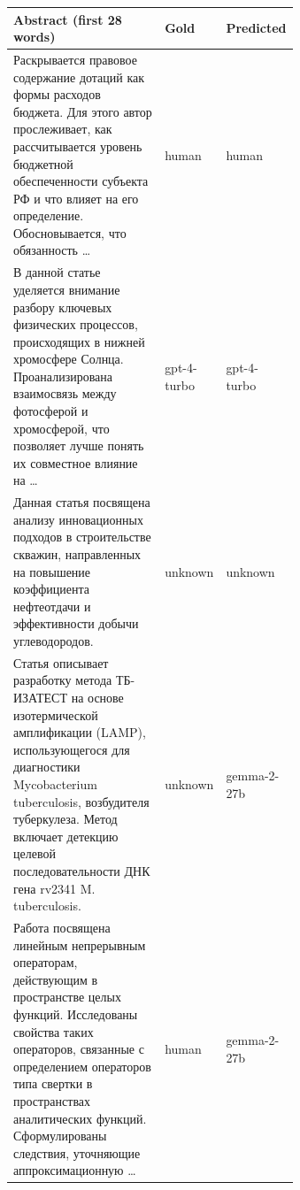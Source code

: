 \begin{tabular}{|p{0.64\linewidth}|l|l|}
\hline
Abstract (first 28 words) & Gold & Predicted \\
\hline
\parbox[t]{0.62\linewidth}{\raggedright\small Раскрывается правовое содержание дотаций как формы расходов бюджета. Для этого автор прослеживает, как рассчитывается уровень бюджетной обеспеченности субъекта РФ и что влияет на его определение. Обосновывается, что обязанность \dots} & human & human \\ \hline
\parbox[t]{0.62\linewidth}{\raggedright\small В данной статье уделяется внимание разбору ключевых физических процессов, происходящих в нижней хромосфере Солнца. Проанализирована взаимосвязь между фотосферой и хромосферой, что позволяет лучше понять их совместное влияние на \dots} & gpt-4-turbo & gpt-4-turbo \\ \hline
\parbox[t]{0.62\linewidth}{\raggedright\small Данная статья посвящена анализу инновационных подходов в строительстве скважин, направленных на повышение коэффициента нефтеотдачи и эффективности добычи углеводородов.} & unknown & unknown \\ \hline
\parbox[t]{0.62\linewidth}{\raggedright\small Статья описывает разработку метода ТБ-ИЗАТЕСТ на основе изотермической амплификации (LAMP), использующегося для диагностики Mycobacterium tuberculosis, возбудителя туберкулеза. Метод включает детекцию целевой последовательности ДНК гена rv2341 M. tuberculosis.} & unknown & gemma-2-27b \\ \hline
\parbox[t]{0.62\linewidth}{\raggedright\small Работа посвящена линейным непрерывным операторам, действующим в пространстве целых функций. Исследованы свойства таких операторов, связанные с определением операторов типа свертки в пространствах аналитических функций. Сформулированы следствия, уточняющие аппроксимационную \dots} & human & gemma-2-27b \\ \hline
\end{tabular}
